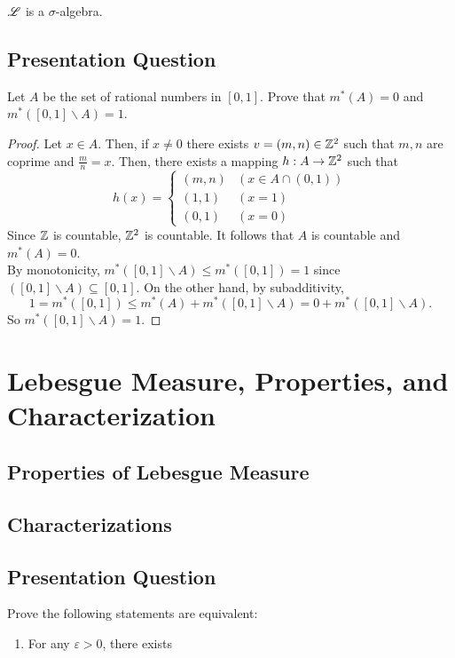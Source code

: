 \documentclass[class=book, crop=false]{standalone}
\begin{document}
        \begin{theorem}
            $\mathscr{L}$ is a $\sigma$-algebra.
        \end{theorem}


        \subsection{Presentation Question}
        \begin{question}
            Let $A$ be the set of rational numbers in $[0, 1]$. Prove that $m^*(A) = 0$ and $m^*([0, 1] \backslash A) = 1$.
        \end{question}
        \begin{proof}
            Let $x \in A$. Then, if $x \neq 0$ there exists $v = (m, n) \in \mathbb{Z}^2$ such that $m, n$ are coprime and $\frac{m}{n} = x$. Then, there exists a mapping $h: A \rightarrow \mathbb{Z}^2$ such that
            \begin{equation*}
                h(x) = \begin{cases}
                    (m, n) & (x \in A \cap (0, 1)) \\
                    (1, 1) & (x = 1) \\
                    (0, 1) & (x = 0)
                \end{cases}
            \end{equation*}
            Since $\mathbb{Z}$ is countable, $\mathbb{Z}^{2}$ is countable. It follows that $A$ is countable and $m^*(A) = 0$. \\
            By monotonicity, $m^*([0, 1] \backslash A) \leq m^*([0, 1]) = 1$ since $([0, 1] \backslash A) \subseteq [0, 1]$. On the other hand, by subadditivity,
            \begin{equation*}
                1 = m^*([0, 1]) \leq m^*(A) + m^*([0, 1] \backslash A) = 0 + m^*([0, 1] \backslash A).
            \end{equation*}
            So $m^*([0, 1] \backslash A) = 1$.
        \end{proof}


    \section{Lebesgue Measure, Properties, and Characterization}
    \subsection{Properties of Lebesgue Measure}
    
    \subsection{Characterizations}
    
    \subsection{Presentation Question}
    \begin{question}
        Prove the following statements are equivalent:
        \begin{enumerate}
            \item For any $\varepsilon > 0$, there exists 
        \end{enumerate}
    \end{question}
\end{document}

